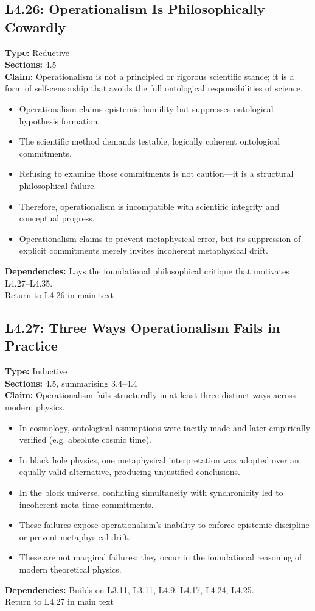 \documentclass[12pt]{book}
\newcommand{\returnlink}[1]{\hyperref[logic:#1]{Return to #1 in main text}\xspace}
\begin{document}
\subsection*{L4.26: Operationalism Is Philosophically Cowardly}
\label{appendix:L4.26}
\textbf{Type:} Reductive \\
\textbf{Sections:} 4.5 \\
\textbf{Claim:} Operationalism is not a principled or rigorous scientific stance; it is a form of self-censorship that avoids the full ontological responsibilities of science.
\begin{itemize}
  \item Operationalism claims epistemic humility but suppresses ontological hypothesis formation.
  \item The scientific method demands testable, logically coherent ontological commitments.
  \item Refusing to examine those commitments is not caution---it is a structural philosophical failure.
  \item Therefore, operationalism is incompatible with scientific integrity and conceptual progress.
  \item Operationalism claims to prevent metaphysical error, but its suppression of explicit commitments merely invites incoherent metaphysical drift.
\end{itemize}
\textbf{Dependencies:} Lays the foundational philosophical critique that motivates L4.27–L4.35.\\
\returnlink{L4.26}

\subsection*{L4.27: Three Ways Operationalism Fails in Practice}
\label{appendix:L4.27}
\textbf{Type:} Inductive \\
\textbf{Sections:} 4.5, summarising 3.4–4.4 \\
\textbf{Claim:} Operationalism fails structurally in at least three distinct ways across modern physics.
\begin{itemize}
  \item In cosmology, ontological assumptions were tacitly made and later empirically verified (e.g. absolute cosmic time).
  \item In black hole physics, one metaphysical interpretation was adopted over an equally valid alternative, producing unjustified conclusions.
  \item In the block universe, conflating simultaneity with synchronicity led to incoherent meta-time commitments.
  \item These failures expose operationalism's inability to enforce epistemic discipline or prevent metaphysical drift.
  \item These are not marginal failures; they occur in the foundational reasoning of modern theoretical physics.
\end{itemize}
\textbf{Dependencies:} Builds on L3.11, L3.11, L4.9, L4.17, L4.24, L4.25.\\
\returnlink{L4.27}
\end{document}

